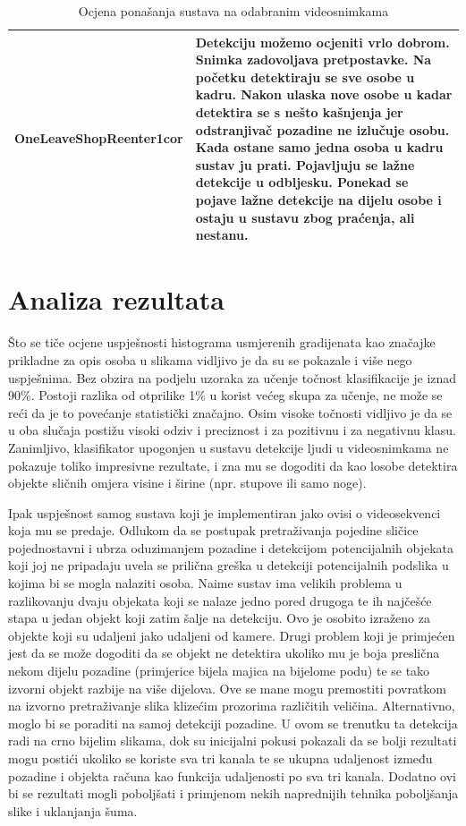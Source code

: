 \documentclass[times, utf8, seminar, numeric]{fer}
\begin{document}
\begin{table}
\begin{center}
\begin{tabular}{|c|p{10cm}|}
OneLeaveShopReenter1cor & Detekciju možemo ocjeniti vrlo dobrom. Snimka zadovoljava pretpostavke. Na početku detektiraju se sve osobe u kadru. Nakon ulaska nove osobe u kadar detektira se s nešto kašnjenja jer odstranjivač pozadine ne izlučuje osobu. Kada ostane samo jedna osoba u kadru sustav ju prati. Pojavljuju se lažne detekcije u odbljesku. Ponekad se pojave lažne detekcije 
na dijelu osobe i ostaju u sustavu zbog praćenja, ali nestanu.  \\ \hline
\end{tabular}
\end{center}
\caption{Ocjena ponašanja sustava na odabranim videosnimkama}
\label{videores}
\end{table}


\section{Analiza rezultata}
Što se tiče ocjene uspješnosti histograma usmjerenih gradijenata kao značajke prikladne za opis osoba u slikama vidljivo je da su se pokazale i više nego uspješnima. Bez obzira na podjelu uzoraka za učenje točnost klasifikacije je iznad 90\%. Postoji razlika od  otprilike 1\% u korist većeg skupa za učenje, ne može se reći da je to povećanje statistički značajno. Osim visoke točnosti vidljivo je da se u oba slučaja postižu visoki odziv i preciznost i za pozitivnu i za negativnu klasu. Zanimljivo, klasifikator upogonjen u sustavu detekcije ljudi u videosnimkama ne pokazuje toliko impresivne rezultate, i zna mu se dogoditi da kao losobe detektira objekte sličnih omjera visine i širine (npr. stupove ili samo noge).

Ipak uspješnost samog sustava koji je implementiran jako ovisi o videosekvenci koja mu se predaje.  Odlukom da se postupak pretraživanja pojedine sličice pojednostavni i ubrza oduzimanjem pozadine i detekcijom potencijalnih objekata koji joj ne pripadaju uvela se prilična greška u detekciji potencijalnih podslika u kojima bi se mogla nalaziti osoba. Naime sustav ima velikih problema u razlikovanju dvaju objekata koji se nalaze jedno pored drugoga te ih najčešće stapa u jedan objekt koji zatim šalje na detekciju. Ovo je osobito izraženo za objekte koji su udaljeni jako udaljeni od kamere. Drugi problem koji je primjećen jest da se može dogoditi da se objekt ne detektira ukoliko mu je boja preslična nekom dijelu pozadine (primjerice bijela majica na bijelome podu) te se tako izvorni objekt razbije na više dijelova. Ove se mane mogu premostiti povratkom na izvorno pretraživanje slika klizećim prozorima različitih veličina. Alternativno, moglo bi se poraditi na samoj detekciji pozadine. U ovom se trenutku ta detekcija radi na crno bijelim slikama, dok su inicijalni pokusi pokazali da se bolji rezultati mogu postići ukoliko se koriste sva tri kanala te se ukupna udaljenost između pozadine i objekta računa kao funkcija udaljenosti po sva tri kanala. Dodatno ovi bi se rezultati mogli poboljšati i primjenom nekih naprednijih tehnika poboljšanja slike i uklanjanja šuma.
\end{document}
